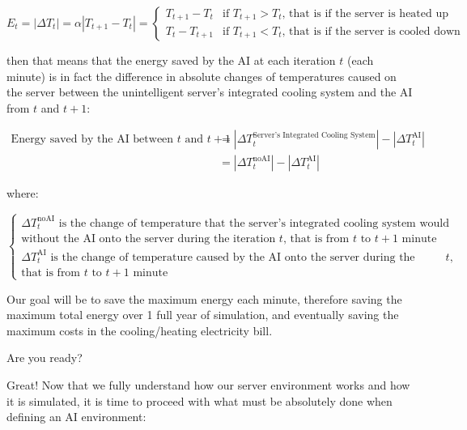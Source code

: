 \documentclass[]{book}
\begin{document}
\begin{equation*}
E_t = |\Delta T_t| = \alpha |T_{t+1} - T_t| =
\begin{cases}
T_{t+1} - T_t & \textrm{if $T_{t+1} > T_t$, that is if the server is heated up} \\
T_t - T_{t+1} & \textrm{if $T_{t+1} < T_t$, that is if the server is cooled down}
\end{cases}
\end{equation*}

then that means that the energy saved by the AI at each iteration \(t\) (each minute) is in fact the difference in absolute changes of temperatures caused on the server between the unintelligent server's integrated cooling system and the AI from \(t\) and \(t+1\):

\begin{align*}
        \textrm{Energy saved by the AI between $t$ and $t+1$}
        & = |\Delta T_t^{\textrm{Server's Integrated Cooling System}}| - |\Delta T_t^{\textrm{AI}}| \\
        & = |\Delta T_t^{\textrm{noAI}}| - |\Delta T_t^{\textrm{AI}}|
\end{align*}

where:

\begin{equation*}
\begin{cases}
\textrm{$\Delta T_t^{\textrm{noAI}}$ is the change of temperature that the server's integrated cooling system would cause} \\
\textrm{without the AI onto the server during the iteration $t$, that is from $t$ to $t+1$ minute} \\
\textrm{$\Delta T_t^{\textrm{AI}}$ is the change of temperature caused by the AI onto the server during the iteration $t$,} \\
\textrm{that is from $t$ to $t+1$ minute}
\end{cases}
\end{equation*}

Our goal will be to save the maximum energy each minute, therefore saving the maximum total energy over 1 full year of simulation, and eventually saving the maximum costs in the cooling/heating electricity bill.

Are you ready?

Great! Now that we fully understand how our server environment works and how it is simulated, it is time to proceed with what must be absolutely done when defining an AI environment:
\end{document}
